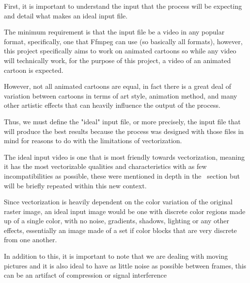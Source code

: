 \documentclass[12pt]{article}
\newcommand{\sentence}{} %
\begin{document}



    \tab
    First, it is important to understand the input that the process will be expecting and detail what makes an ideal
    input file.
    \sentence
    The minimum requirement is that the input file be a video in any popular format, specifically, one that Ffmpeg
    can use (so basically all formats), however, this project specifically aims to work on animated cartoons so while
    any video will technically work, for the purpose of this project, a video of an animated cartoon is expected.
    \sentence
    However, not all animated cartoons are equal, in fact there is a great deal of variation between cartoons in
    terms of art style, animation method, and many other artistic effects that can heavily influence the output of
    the process.
    \sentence
    Thus, we must define the "ideal" input file, or more precisely, the input file that will produce the best results
    because the process was designed with those files in mind for reasons to do with the limitations of vectorization.
    \sentence
    The ideal input video is one that is most friendly towards vectorization, meaning it has the most vectorizable
    qualities and characteristics with as few incompatibilities as possible, these were mentioned in depth
    in the~ section but will be briefly repeated within this new context.
    \sentence
    Since vectorization is heavily dependent on the color variation of the original raster image, an ideal input
    image would be one with discrete color regions made up of a single color, with no noise, gradients, shadows,
    lighting or any other effects, essentially an image made of a set if color blocks that are very discrete from one
    another.
    \sentence
    In addition to this, it is important to note that we are dealing with moving pictures and it is also ideal to
    have as little noise as possible between frames, this can be an artifact of compression or signal interference
\end{document}
